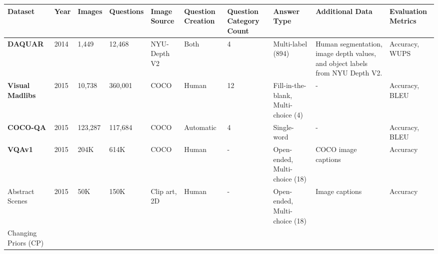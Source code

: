 \begin{landscape}
  \begin{footnotesize}
      \begin{center}
        \begin{xltabular}{\linewidth}{LlllLLLLLL}
          \toprule
          \textbf{Dataset}
          & \textbf{Year}
          & \textbf{Images}
          & \textbf{Questions}
          & \textbf{Image Source}
          & \textbf{Question Creation}
          & \textbf{Question Category Count}
          & \textbf{Answer Type}
          & \textbf{Additional Data}
          & \textbf{Evaluation Metrics}\\
          \midrule
          \textbf{DAQUAR} \cite{malinowski2014multiworld}
          & 2014
          & 1,449  %
          & 12,468  %
          & NYU-Depth V2 \cite{silberman2012indoor}
          & Both
          & 4
          & Multi-label (894)
          & Human segmentation, image depth values, and object labels from NYU Depth V2.
          & Accuracy, WUPS \\
          \textbf{Visual Madlibs} \cite{yu2015visual}
          & 2015
          & 10,738  %
          & 360,001  %
          & COCO \cite{lin2014microsoft}
          & Human
          & 12
          & Fill-in-the-blank, Multi-choice (4)
          & -
          & Accuracy, BLEU \\
          \textbf{COCO-QA}
          & 2015
          & 123,287
          & 117,684
          & COCO
          & Automatic
          & 4
          & Single-word
          & -
          & Accuracy, BLEU \\
          \textbf{VQAv1} \cite{antol2015vqa}
          & 2015
          & 204K  %
          & 614K  %
          & COCO
          & Human
          & -
          & Open-ended, Multi-choice (18)
          & COCO image captions
          & Accuracy\footnotemark \\
          Abstract Scenes
          & 2015
          & 50K  %
          & 150K  %
          & Clip art, 2D
          & Human
          & -
          & Open-ended, Multi-choice (18)
          & Image captions
          & Accuracy\footnotemark[\value{footnote}] \\
          Changing Priors (CP) \cite{agrawal2018dont}

\end{xltabular}
\end{center}
\end{footnotesize}
\end{landscape}
